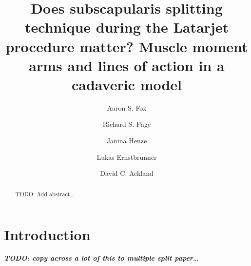 \documentclass[]{elsarticle} %
\begin{document}
\begin{frontmatter}

  \title{Does subscapularis splitting technique during the Latarjet
procedure matter? Muscle moment arms and lines of action in a cadaveric
model}
    \author[Centre for Sports Research,Barwon Centre for Orthopaedic
Research and Education (B-CORE)]{Aaron S. Fox}
  
    \author[Barwon Centre for Orthopaedic Research and Education
(B-CORE),School of Medicine,Orthopaedic Department]{Richard S. Page}
  
    \author[TODO]{Janina Henze}
  
    \author[Department of Orthopaedic Surgery]{Lukas Ernstbrunner}
  
    \author[Department of Biomedical Engineering]{David C. Ackland}
  
      \address[Centre for Sports Research]{Centre for Sports Research,
School of Exercise and Nutrition Sciences, Deakin University, Geelong,
Australia}
    \address[Barwon Centre for Orthopaedic Research and Education
(B-CORE)]{Barwon Centre for Orthopaedic Research and Education (B-CORE),
Barwon Health, St John of Jod Hospital and Deakin University, Geelong,
Australia}
    \address[School of Medicine]{School of Medicine, Deakin University,
Geelong, Australia}
    \address[Orthopaedic Department]{Orthopaedic Department, University
Hospital Geelong, Barwon Health, Geelong, Australia}
    \address[Department of Orthopaedic Surgery]{Department of
Orthopaedic Surgery, University Hospital Balgrist, Zurich, Switzerland}
    \address[Department of Biomedical Engineering]{Department of
Biomedical Engineering, University of Melbourne, Parkville, Australia}
  
  \begin{abstract}
  TODO: Add abstract\ldots{}
  \end{abstract}
  
 \end{frontmatter}

\hypertarget{introduction}{%
\section{Introduction}\label{introduction}}

\textbf{\emph{TODO: copy across a lot of this to multiple split
paper\ldots{}}}
\end{document}
